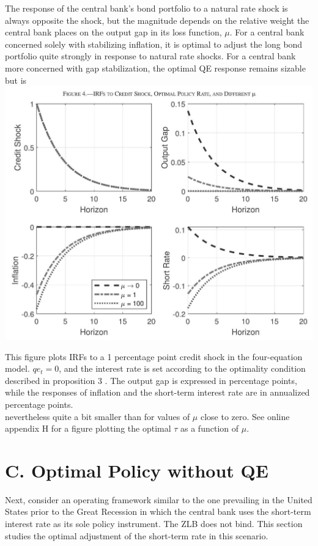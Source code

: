 \documentclass[10pt]{article}
\begin{document}
The response of the central bank's bond portfolio to a natural rate shock is always opposite the shock, but the magnitude depends on the relative weight the central bank places on the output gap in its loss function, $\mu$. For a central bank concerned solely with stabilizing inflation, it is optimal to adjust the long bond portfolio quite strongly in response to natural rate shocks. For a central bank more concerned with gap stabilization, the optimal QE response remains sizable but is\\
\includegraphics[max width=\textwidth, center]{2024_12_20_098a9c078f922ab7e4b1g-12}

This figure plots IRFs to a 1 percentage point credit shock in the four-equation model. $q e_{t}=0$, and the interest rate is set according to the optimality condition described in proposition 3 . The output gap is expressed in percentage points, while the responses of inflation and the short-term interest rate are in annualized percentage points.\\
nevertheless quite a bit smaller than for values of $\mu$ close to zero. See online appendix H for a figure plotting the optimal $\tau$ as a function of $\mu$.

\section*{C. Optimal Policy without QE}
Next, consider an operating framework similar to the one prevailing in the United States prior to the Great Recession in which the central bank uses the short-term interest rate as its sole policy instrument. The ZLB does not bind. This section studies the optimal adjustment of the short-term rate in this scenario.
\end{document}
